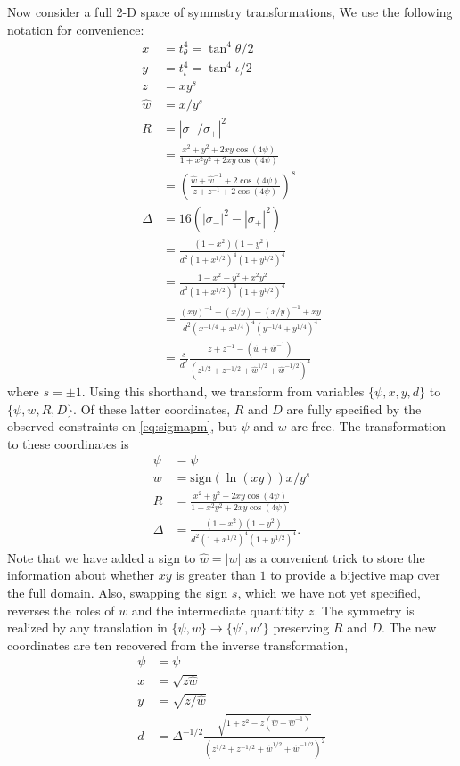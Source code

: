 \documentclass[aps,showpacs,twocolumn,prd,superscriptaddress,nofootinbib]{revtex4}
\newcommand\C{{\cos(4\psi)}}
\begin{document}
Now consider a full 2-D space of symmstry transformations,
We use the following notation for convenience:
\begin{align}
  x&=t^4_{\theta}=\tan^4{\theta/2}\\
  y&=t^4_{\iota}=\tan^4{\iota/2}\\
  z&=xy^s\\
  \hat w&=x/y^s\\
  R&=|\sigma_-/\sigma_+|^2\\
  &=\frac{x^2+y^2+2xy\C}{1+x^2y^2+2xy\C}\\
  &=\left(\frac{\hat w+\hat w^{-1}+2\C}{z+z^{-1}+2\C}\right)^s\\
  \Delta&=16(|\sigma_-|^2-|\sigma_+|^2)\\
  &=\frac{(1-x^2)(1-y^2)}{d^2(1+x^{1/2})^4(1+y^{1/2})^4}\\
  &=\frac{1-x^2-y^2+x^2y^2}{d^2(1+x^{1/2})^4(1+y^{1/2})^4}\\
  &=\frac{(xy)^{-1}-(x/y)-(x/y)^{-1}+xy}{d^2(x^{-1/4}+x^{1/4})^4(y^{-1/4}+y^{1/4})^4}\\
  &=\frac{s}{d^2}\frac{z+z^{-1}-(\hat w+{\hat w}^{-1})}{(z^{1/2}+z^{-1/2}+{\hat w}^{1/2}+{\hat w}^{-1/2})^4}
\end{align}
where $s=\pm1$.
Using this shorthand, we transform from variables $\{\psi,x,y,d\}$ to $\{\psi,w,R,D\}$.
Of these latter coordinates, $R$ and $D$ are fully specified by the observed constraints on \eqref{eq:sigmapm},
but $\psi$ and $w$ are free. The transformation to these coordinates is
\begin{align}
  \psi&=\psi\\
  w&=\mathrm{sign}(\ln(xy))x/y^s\\
  R&=\frac{x^2+y^2+2xy\C}{1+x^2y^2+2xy\C}\\
  \Delta&=\frac{(1-x^2)(1-y^2)}{d^2(1+x^{1/2})^4(1+y^{1/2})^4}.
\end{align}
Note that we have added a sign to ${\hat w}=|w|$ as a convenient trick to
store the information about whether $xy$ is greater than $1$ to provide a bijective map over the full domain. 
Also, swapping the sign $s$, which we have not yet specified, reverses the roles of $w$ and the intermediate quantitity $z$.
The symmetry is realized by any translation in $\{\psi,w\}\rightarrow\{\psi',w'\}$ preserving $R$ and $D$.
The new coordinates are ten recovered from the inverse transformation, 
\begin{align}
  \psi&=\psi\\
  x&=\sqrt{z\hat w}\\
  y&=\sqrt{z/{\hat w}}\\
  d&={\Delta^{-1/2}}\frac {\sqrt{1+z^2-z(\hat w+{\hat w}^{-1})}}{(z^{1/2}+z^{-1/2}+{\hat w}^{1/2}+{\hat w}^{-1/2})^2}
\end{align}
\end{document}
